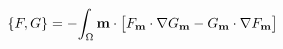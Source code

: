 \documentclass[preview]{standalone}
\begin{document}
\begin{align*}
\special{dvisvgm:raw <g id='unique000'>}\{F,G\}=-\!\int_\Omega \mathbf{m}\cdot\big[F_{\mathbf m}\cdot\nabla G_{\mathbf m}-G_{\mathbf m}\cdot\nabla F_{\mathbf m}\big]\special{dvisvgm:raw </g>}
\end{align*}
\end{document}
